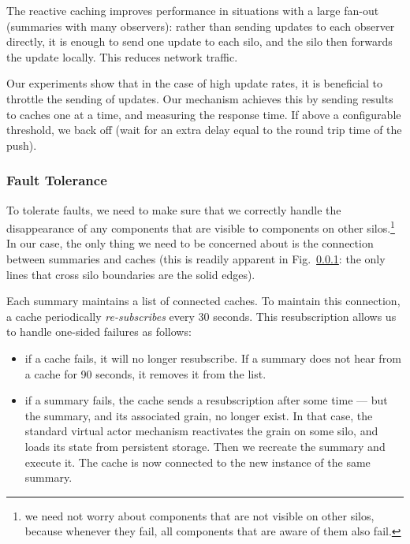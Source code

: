  The reactive caching improves performance in situations with a large fan-out (summaries with many observers): rather than sending updates to each observer directly, it is enough to send one update to each silo, and the silo then forwards the update locally. This reduces network traffic.

Our experiments show that in the case of high update rates, it is beneficial to throttle the sending of updates. Our mechanism achieves this by sending results to caches one at a time, and measuring the response time. If above a configurable threshold, we back off (wait for an extra delay equal to the round trip time of the push). 

\subsubsection{Fault Tolerance}

To tolerate faults, we need to make sure that we correctly handle the disappearance of any components that are visible to components on other silos.\footnote{we need not worry about components that are not visible on other silos, because whenever they fail, all components that are aware of them also fail.} In our case, the only thing we need to be concerned about is the connection between summaries and caches (this is readily apparent in Fig.~\ref{}: the only lines that cross silo boundaries are the solid edges).

Each summary maintains a list of connected caches. To maintain this connection, a cache periodically \emph{re-subscribes} every 30 seconds. This resubscription allows us to handle one-sided failures as follows:
\begin{itemize}
\item if a cache fails, it will no longer resubscribe. If a summary does not hear from a cache for 90 seconds, it removes it from the list. 
\item if a summary fails, the cache sends a resubscription after some time --- but the summary, and its associated grain, no longer exist. In that case, the standard virtual actor mechanism reactivates the grain on some silo, and loads its state from persistent storage. Then we recreate the summary and execute it. The cache is now connected to the new instance of the same summary. 
\end{itemize}
